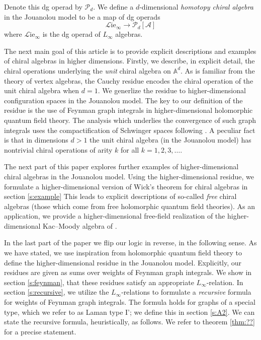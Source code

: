 \documentclass[11pt]{amsart}
\theoremstyle{definition}
\theoremstyle{remark}
\numberwithin{equation}{section}
\begin{document}
Denote this dg operad by $\mathcal{P}_d$. We define a $d$-dimensional \textit{homotopy chiral algebra} in the Jouanolou
model to be a map of dg operads 
  \begin{equation}\label{}
  \mathcal{L} \mathrm{ie}_\infty \to \mathcal{P}_d [\mathcal{A}] 
  \end{equation}
  where $\mathcal{L}\mathrm{ie}_\infty$ is the dg operad of $L_\infty$ algebras.

The next main goal of this article is to provide explicit descriptions and examples of chiral algebras in higher dimensions.
Firstly, we describe, in explicit detail, the chiral operations underlying the \textit{unit} chiral algebra on $\mathbb{A}^d$.
As is familiar from the theory of vertex algebras, the Cauchy residue encodes the chiral operation of the unit chiral algebra
when $d=1$.
We generlize the residue to higher-dimensional configuration spaces in the Jouanolou model.
The key to our definition of the residue is the use of Feynman graph integrals in higher-dimensional holomorphic quantum field theory.
The analysis which underlies the convergence of such graph integrals uses the compactification of Schwinger spaces
following \cite{wang2024feynman}.
A peculiar fact is that in dimensions $d > 1$ the unit chiral algebra (in the Jouanolou model) has nontrivial chiral
operations of arity $k$ for all $k = 1,2,3,\ldots$.

The next part of this paper explores further examples of higher-dimensional chiral algebras in the Jouanolou model.
Using the higher-dimensional residue, we formulate a higher-dimensional version of Wick's theorem for
chiral algebras in section \ref{s:example}
This leads to explicit descriptions of so-called \textit{free} chiral algebras (those which come from free holomorphic
quantum field theories).
As an application, we provide a higher-dimensional free-field realization of the higher-dimensional Kac--Moody algebra
of \cite{FHK}.

In the last part of the paper we flip our logic in reverse, in the following sense.
As we have stated, we use inspiration from holomorphic quantum field theory to define the higher-dimensional residue in
the Jouanolou model.
Explicitly, our residues are given as sums over weights of Feynman graph integrals.
We show in section \ref{s:feynman}, that these residues satisfy an appropriate $L_\infty$-relation.
In section \ref{s:recursive}, we utilize the $L_\infty$-relations to formulate a \textit{recursive} formula for weights
of Feynman graph integrals.
The formula holds for graphs of a special type, which we refer to as Laman type I'; we define this in section \ref{s:A2}.
We can state the recursive formula, heuristically, as follows.
We refer to theorem \ref{thm:??} for a precise statement.
\end{document}
